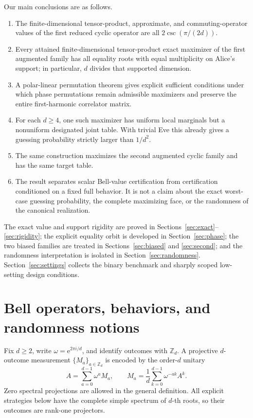 \documentclass[11pt]{article}
\theoremstyle{definition}
\theoremstyle{remark}
\newcommand{\e}{\mathrm e}
\newcommand{\bbZ}{\mathbb Z}
\begin{document}
Our main conclusions are as follows.
\begin{enumerate}[leftmargin=1.6em]
\item The finite-dimensional tensor-product, approximate, and
commuting-operator values of the first reduced cyclic operator are all
\(2\csc(\pi/(2d))\).
\item Every attained finite-dimensional tensor-product exact maximizer of the
first augmented family has all equality roots with equal multiplicity on
Alice's support; in particular, \(d\) divides that supported dimension.
\item A polar-linear permutation theorem gives explicit sufficient conditions
under which phase permutations remain admissible maximizers and preserve the
entire first-harmonic correlator matrix.
\item For each \(d\geq4\), one such maximizer has uniform local marginals but
a nonuniform designated joint table.  With trivial Eve this already gives a
guessing probability strictly larger than \(1/d^2\).
\item The same construction maximizes the second augmented cyclic family and
has the same target table.
\item The result separates scalar Bell-value certification from certification
conditioned on a fixed full behavior.  It is not a claim about the exact
worst-case guessing probability, the complete maximizing face, or the
randomness of the canonical realization.
\end{enumerate}

The exact value and support rigidity are proved in
Sections~\ref{sec:exact}--\ref{sec:rigidity}; the explicit equality orbit is
developed in Section~\ref{sec:phase};
the two biased families are treated in Sections~\ref{sec:biased} and
\ref{sec:second}; and the randomness interpretation is isolated in
Section~\ref{sec:randomness}.  Section~\ref{sec:settings} collects the
binary benchmark and sharply scoped low-setting design conditions.

\section{Bell operators, behaviors, and randomness notions}
\label{sec:framework}

Fix \(d\geq2\), write \(\omega=\e^{2\pi i/d}\), and identify outcomes with
\(\bbZ_d\).  A projective \(d\)-outcome measurement
\(\{M_a\}_{a\in\bbZ_d}\) is encoded by the order-\(d\) unitary
\[
 A=\sum_{a=0}^{d-1}\omega^aM_a,
 \qquad
 M_a=\frac1d\sum_{k=0}^{d-1}\omega^{-ak}A^k.
\]
Zero spectral projections are allowed in the general definition.  All
explicit strategies below have the complete simple spectrum of \(d\)-th
roots, so their outcomes are rank-one projectors.
\end{document}
